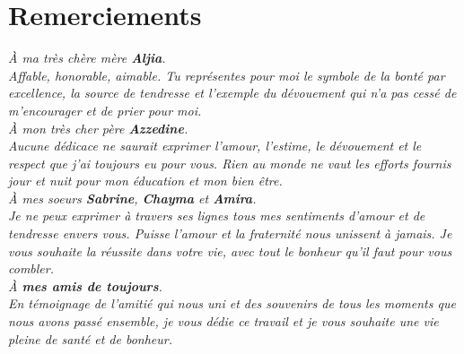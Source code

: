 \chapter*{\huge Remerciements}

\begin{center}
\it \Large
    À ma très chère mère {\Large \textbf{Aljia}}.\\
    Affable, honorable, aimable. Tu représentes pour moi le symbole de la bonté par excellence, la source de tendresse et l’exemple du dévouement qui n’a pas cessé de m’encourager et de prier pour moi.\\
    À mon très cher père {\Large \textbf{Azzedine}}.\\
    Aucune dédicace ne saurait exprimer l’amour, l’estime, le dévouement et le respect que j’ai toujours eu pour vous. Rien au monde ne vaut les efforts fournis jour et nuit pour mon éducation et mon bien être.\\
    À mes soeurs {\Large \textbf{Sabrine}}, {\Large \textbf{Chayma}} et {\Large \textbf{Amira}}.\\
    Je ne peux exprimer à travers ses lignes tous mes sentiments d’amour et de tendresse envers vous. Puisse l’amour et la fraternité nous unissent à jamais. Je vous souhaite la réussite dans votre vie, avec tout le bonheur qu’il faut pour vous combler.\\
    À \textbf{mes amis de toujours}.\\
    En témoignage de l’amitié qui nous uni et des souvenirs de tous les moments que nous avons passé ensemble, je vous dédie ce travail et je vous souhaite une vie pleine de santé et de bonheur.\\
\end{center}
